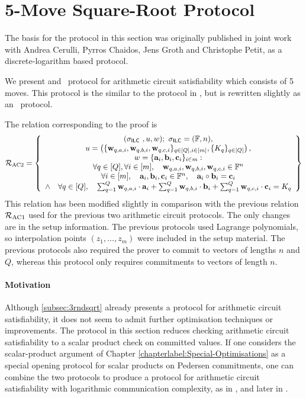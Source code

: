 \section{5-Move Square-Root Protocol} \label{subsec:5rndsqrt}

The basis for the protocol in this section was originally published in joint work \cite{BootleCCGP16} with Andrea Cerulli, Pyrros Chaidos, Jens Groth and Christophe Petit, as a discrete-logarithm based protocol.

We present and \ILC\ protocol for arithmetic circuit satisfiability which consists of 5 moves. This protocol is the similar to the protocol in \cite{BootleG18}, but is rewritten slightly as an \ILC\ protocol.

The relation corresponding to the proof is
\[
\mathcal{R}_{\textnormal{AC2}}=\left\{\begin{array}{c}
(\mathsf{\sigma}_{\mathsf{ILC}~},u,w); \ \mathsf{\sigma}_{\mathsf{ILC}} = (\mathbb{F},n), \\
u = \left( \{\mathbf{w}_{q,{a,i}},\mathbf{w}_{q,{b,i}},\mathbf{w}_{q,{c,i}}\}_{q \in [Q], i \in [m]}, \{K_{q}\}_{q \in [Q]}\right), \\
w = \{\mathbf{a}_i,\mathbf{b}_i,\mathbf{c}_i\}_{i \in m}:\\
\forall q \in [Q], \forall i \in [m], \quad \mathbf{w}_{q,a,i}, \mathbf{w}_{q,b,i}, \mathbf{w}_{q,c,i} \in \mathbb{F}^n \\
\forall i \in [m], \quad \mathbf{a}_i,\mathbf{b}_i,\mathbf{c}_i \in \mathbb{F}^n, \quad \mathbf{a}_i \circ \mathbf{b}_i=\mathbf{c}_i \\
\wedge \quad \forall q \in [Q], \quad \sum_{q=1}^Q \mathbf{w}_{q,a,i} \cdot \mathbf{a}_i + \sum_{q=1}^Q \mathbf{w}_{q,b,i} \cdot \mathbf{b}_i + \sum_{q=1}^Q \mathbf{w}_{q,c,i} \cdot \mathbf{c}_i = K_q
\end{array}\right\}
\]
This relation has been modified slightly in comparison with the previous relation $\mathcal{R}_\text{AC1}$ used for the previous two arithmetic circuit protocols. The only changes are in the setup information. The previous protocols used Lagrange polynomials, so interpolation points $(z_1,\ldots,z_m)$ were included in the setup material. The previous protocols also required the prover to commit to vectors of lengths $n$ and $Q$, whereas this protocol only requires commitments to vectors of length $n$.

\paragraph{Motivation} Although \ref{subsec:3rndsqrt} already presents a protocol for arithmetic circuit satisfiability, it does not seem to admit further optimisation techniques or improvements. The protocol in this section reduces checking arithmetic circuit satisfiability to a scalar product check on committed values. If one considers the scalar-product argument of Chapter \ref{chapterlabel:Special-Optimisations} as a special opening protocol for scalar products on Pedersen commitments, one can combine the two protocols to produce a protocol for arithmetic circuit satisfiability with logarithmic communication complexity, as in \cite{BootleCCGP16}, and later in \cite{BunzBBPWM18}.

